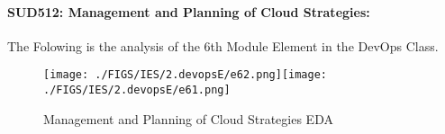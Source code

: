 \documentclass[12pt]{extreport}
\begin{document}

\paragraph{\large SUD512: Management and Planning of Cloud Strategies:\\
} 
The Folowing is the analysis of the 6th Module Element in the DevOps Class.

\begin{figure}[H]
	\centering
	\texttt{[image: ./FIGS/IES/2.devopsE/e62.png]}\texttt{[image: ./FIGS/IES/2.devopsE/e61.png]}
	\caption{Management and Planning of Cloud Strategies EDA}
	\label{fig:26}
\end{figure}
\begin{comment}

\subparagraph{Interpretation of the Box-plots:}
The numbers Below and the boxplots above show that also in this element  TSI students performance is slightly better than PSI students and half of the MP Students.



\begin{enumerate}	
	\item The MP Class Box-Plot:
	\begin{enumerate}
		\item MAX = a {} {} {} {} {} {} {} {} UQ = b {} {} {} {} {} {} {} {} Median = c
		\item LQ = d {} {} {} {} {} {} {} {}  MIN =	l {} {} {} {} {} {} {} {}  IQR = e - f = g
	\end{enumerate}
	\item The PSI Class Box-Plot:
	\begin{enumerate}
		\item MAX = a {} {} {} {} {} {} {} {} UQ = b {} {} {} {} {} {} {} {} Median = c
		\item LQ = d {} {} {} {} {} {} {} {}  MIN =	e {} {} {} {} {} {} {} {} IQR = f - g = h	
	\end{enumerate}
	\item The TSI Class Box-Plot:
	\begin{enumerate}
		\item MAX = a {} {} {} {} {} {} {} {} UQ = b {} {} {} {} {} {} {} {} Median = c
		\item LQ = d {} {} {} {} {} {} {} {} MIN = e {} {} {} {} {} {} {} {} IQR = f - g = h	
	\end{enumerate}
\end{enumerate}




\subparagraph{Interpretation of the histogram:}
This Frequency Distribution is (Skeness) with the following descriptive statistics:

\begin{enumerate}
	\item Mean = 12.51
	\item STD = 5.99
	\item Range = 18.5 - 0 = 18.5
	\item IQR = 16.75 - 11.25 = 5.5
\end{enumerate}

\end{comment}
\end{document}
